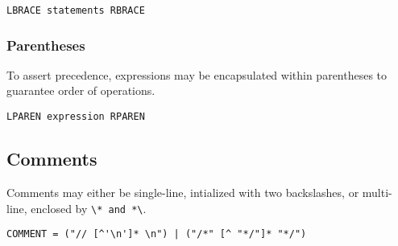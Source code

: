 			\begin{verbatim}
LBRACE statements RBRACE
			\end{verbatim}
			
		\subsubsection{Parentheses}
			To assert precedence, expressions may be encapsulated within parentheses to guarantee order of operations. 
			
			\begin{verbatim}
LPAREN expression RPAREN
			\end{verbatim}
			
		\subsection{Comments}
			Comments may either be single-line, intialized with two backslashes, or multi-line, enclosed by \verb|\* and *\|.

            \begin{verbatim}
COMMENT = ("// [^'\n']* \n") | ("/*" [^ "*/"]* "*/")
            \end{verbatim}

